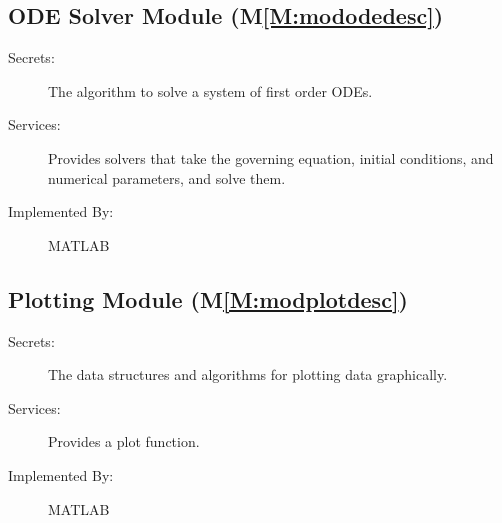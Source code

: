 \documentclass[12pt]{article}
\begin{document}
\subsection{ODE Solver Module (M\ref{M:mododedesc})}
\label{Sec:ODESolvModu()}
\begin{description}
\item[Secrets:]The algorithm to solve a system of first order ODEs.
\item[Services:]Provides solvers that take the governing equation, initial conditions, and numerical parameters, and solve them.
\item[Implemented By:]MATLAB
\end{description}
\subsection{Plotting Module (M\ref{M:modplotdesc})}
\label{Sec:PlotModu()}
\begin{description}
\item[Secrets:]The data structures and algorithms for plotting data graphically.
\item[Services:]Provides a plot function.
\item[Implemented By:]MATLAB
\end{description}
\end{document}
